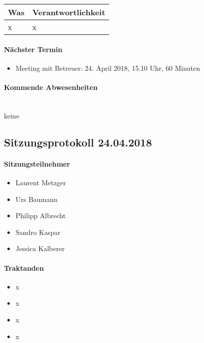 \begin{table}[H]
	\centering
	\begin{tabularx}{\textwidth}{X | p{4.5cm}}
		\rowcolor{gray!50}
		\textbf{Was} & \textbf{Verantwortlichkeit} \\
		\hline
		x & x \\	
	\end{tabularx}
	\label{tab:my-label}
\end{table}

\paragraph{Nächster Termin}
\begin{itemize}	
	\item Meeting mit Betreuer: 24. April 2018, 15.10 Uhr, 60 Minuten
\end{itemize}

\paragraph{Kommende Abwesenheiten} \mbox{}\\
keine


\newpage



\subsection{Sitzungsprotokoll 24.04.2018}

\paragraph{Sitzungsteilnehmer}
\begin{itemize}	
	\item Laurent Metzger 
	\item Urs Baumann
	\item Philipp Albrecht
	\item Sandro Kaspar
	\item Jessica Kalberer
\end{itemize}

\paragraph{Traktanden}
\begin{itemize}	
	\item x
	\item x
	\item x
	\item x
\end{itemize}

